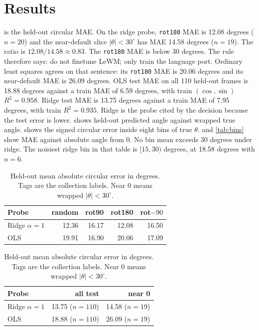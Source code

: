 \documentclass[11pt,a4paper]{article}
\begin{document}
\section{Results}
\label{sec:results}
 is the held-out circular MAE.
On the ridge probe, \texttt{rot180} MAE is 12.08 degrees ($n=20$) and the near-default slice $|\theta|<30^{\circ}$ has MAE 14.58 degrees ($n=19$).
The ratio is $12.08/14.58\approx 0.83$.
The \texttt{rot180} MAE is below 30 degrees.
The rule therefore says: do not finetune LeWM; only train the language port.
Ordinary least squares agrees on that sentence: its \texttt{rot180} MAE is 20.06 degrees and its near-default MAE is 26.09 degrees.
OLS test MAE on all 110 held-out frames is 18.88 degrees against a train MAE of 6.59 degrees, with train $(\cos,\sin)$ $R^{2}=0.958$.
Ridge test MAE is 13.75 degrees against a train MAE of 7.95 degrees, with train $R^{2}=0.935$.
Ridge is the probe cited by the decision because the test error is lower.
 shows held-out predicted angle against wrapped true angle.
 shows the signed circular error inside eight bins of true $\theta$.
 and \cref{tab:bins} show MAE against absolute angle from 0.
No bin mean exceeds 30 degrees under ridge.
The noisiest ridge bin in that table is $[15,30)$ degrees, at 18.58 degrees with $n=6$.

\begin{table}[t]
\centering
\caption{Held-out mean absolute circular error in degrees.
Tags are the collection labels.
Near 0 means wrapped $|\theta|<30^{\circ}$.}
\label{tab:mae}
\begin{tabular}{lrrrr}
\toprule
Probe & random & rot90 & rot180 & rot$-90$ \\
\midrule
Ridge $\alpha=1$ & 12.36 & 16.17 & 12.08 & 16.50 \\
OLS & 19.91 & 16.90 & 20.06 & 17.09 \\
\bottomrule
\end{tabular}

\vspace{0.6em}
\begin{tabular}{lrr}
\toprule
Probe & all test & near 0 \\
\midrule
Ridge $\alpha=1$ & 13.75 ($n=110$) & 14.58 ($n=19$) \\
OLS & 18.88 ($n=110$) & 26.09 ($n=19$) \\
\bottomrule
\end{tabular}
\end{table}
\end{document}
